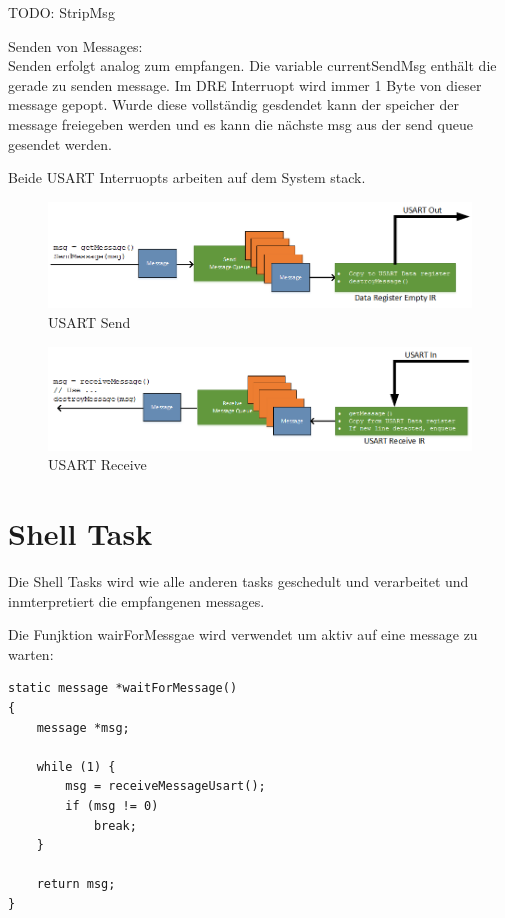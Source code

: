 \documentclass[fontsize=12pt, toc=bibliography, notitlepage]{scrreprt}
\begin{document}
TODO: StripMsg

Senden von Messages: \\
Senden erfolgt analog zum empfangen. Die variable currentSendMsg enthält die gerade zu senden message. Im DRE Interruopt wird immer 1 Byte von dieser message gepopt. Wurde diese vollständig gesdendet kann der speicher der message freiegeben werden und es kann die nächste msg aus der send queue gesendet werden.

Beide USART Interruopts arbeiten auf dem System stack.

\begin{figure}[H]
	\centering
	\includegraphics[width=450px]{images/UsartOut.png}
	\caption{USART Send}
	\label{fig:usart_send}
\end{figure}

\begin{figure}[H]
	\centering
	\includegraphics[width=450px]{images/UsartIn.png}
	\caption{USART Receive}
	\label{fig:usart_receive}
\end{figure}

\section{Shell Task}
\label{subsec:shell-task}
Die Shell Tasks wird wie alle anderen tasks geschedult und verarbeitet und inmterpretiert die empfangenen messages.

Die Funjktion wairForMessgae wird verwendet um aktiv auf eine message zu warten:

\begin{lstlisting}
static message *waitForMessage()
{
    message *msg;

    while (1) {
        msg = receiveMessageUsart();
        if (msg != 0)
            break;
    }

    return msg;
}
\end{lstlisting}
\end{document}
